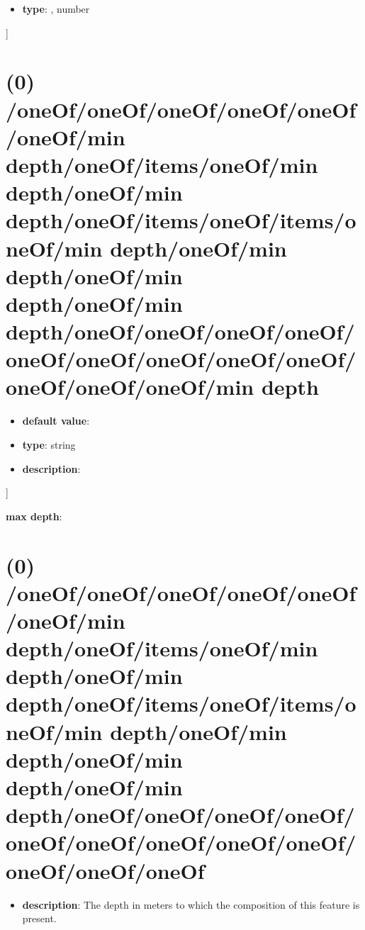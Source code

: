 \begin{itemize}[leftmargin=5em]\item {\bf type}: , number\end{itemize}]\section{(0) /oneOf/oneOf/oneOf/oneOf/oneOf/oneOf/min depth/oneOf/items/oneOf/min depth/oneOf/min depth/oneOf/items/oneOf/items/oneOf/min depth/oneOf/min depth/oneOf/min depth/oneOf/min depth/oneOf/oneOf/oneOf/oneOf/oneOf/oneOf/oneOf/oneOf/oneOf/oneOf/oneOf/oneOf/min depth}
\begin{itemize}[leftmargin=0em]\item {\bf default value}: 
\item {\bf type}: string
\item {\bf description}: 
\end{itemize}]\item {\bf max depth}: \section{(0) /oneOf/oneOf/oneOf/oneOf/oneOf/oneOf/min depth/oneOf/items/oneOf/min depth/oneOf/min depth/oneOf/items/oneOf/items/oneOf/min depth/oneOf/min depth/oneOf/min depth/oneOf/min depth/oneOf/oneOf/oneOf/oneOf/oneOf/oneOf/oneOf/oneOf/oneOf/oneOf/oneOf/oneOf}
\begin{itemize}[leftmargin=0em]\item {\bf description}: The depth in meters to which the composition of this feature is present.
\end{itemize}
